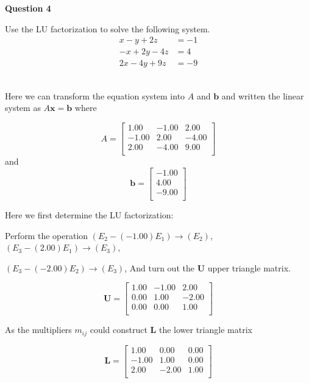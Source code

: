 

\begin{tcolorbox}
\textbf{Question 4} 

Use the LU factorization to solve the following system.
$$
\begin{aligned}
x-y+2 z &=-1 \\
-x+2 y-4 z &=4 \\
2 x-4 y+9 z &=-9
\end{aligned}
$$





\end{tcolorbox}

\begin{solution}\ \\
Here we can transform the equation system into $A$ and $\mathbf b$ and written the linear system as $A \mathbf x = \mathbf b$ where

$$ 
A=
 \begin{bmatrix} 
    1.00 &    -1.00 &     2.00 \\ 
   -1.00 &     2.00 &    -4.00 \\ 
    2.00 &    -4.00 &     9.00 \\ 
\end{bmatrix} 
 $$ 
and
$$ 
\mathbf b=
 \begin{bmatrix} 
   -1.00 \\ 
    4.00 \\ 
   -9.00 \\ 
\end{bmatrix} 
 $$ 


Here we first determine the LU factorization:

Perform the operation 
 $ ( E_{2} - (-1.00) E_{1}) \rightarrow (E_{2}) $,  $ ( E_{3} - (2.00) E_{1}) \rightarrow (E_{3}) $, 
 
 $ ( E_{3} - (-2.00) E_{2}) \rightarrow (E_{3}) $, And turn out the $\mathbf U$ upper triangle matrix.
 
$$ 
\mathbf U=
 \begin{bmatrix} 
    1.00 &    -1.00 &     2.00  \\ 
    0.00 &     1.00 &    -2.00  \\ 
    0.00 &     0.00 &     1.00  \\ 
\end{bmatrix} 
 $$ 

 
 As the multipliers $m_{ij}$ could construct $\mathbf L$ the lower triangle matrix
 
 
 $$ 
 \mathbf L =
 \begin{bmatrix} 
    1.00 &     0.00 &     0.00 \\ 
   -1.00 &     1.00 &     0.00 \\ 
    2.00 &    -2.00 &     1.00 \\ 
\end{bmatrix} 
 $$
 

\end{solution}
